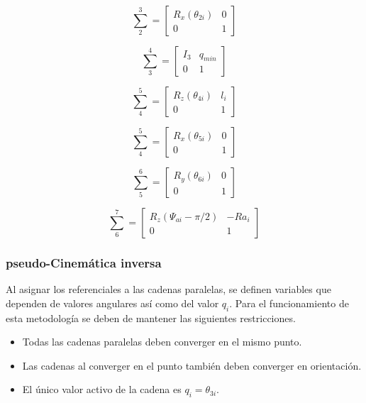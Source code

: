 \begin{equation}
\sum_2^3 = \begin{bmatrix}
R_x(\theta_{2i}) & 0\\
0 & 1
\end{bmatrix}
\end{equation}

\begin{equation}
\sum_3^4 = \begin{bmatrix}
I_3 & q_{min}\\
0 & 1
\end{bmatrix}
\end{equation}

\begin{equation}
\sum_4^5 = \begin{bmatrix}
R_z(\theta_{4i}) & l_i\\
0 & 1
\end{bmatrix}
\end{equation}

\begin{equation}
\sum_4^5 = \begin{bmatrix}
R_x(\theta_{5i}) & 0\\
0 & 1
\end{bmatrix}
\end{equation}

\begin{equation}
\sum_5^6 = \begin{bmatrix}
R_y(\theta_{6i}) & 0\\
0 & 1
\end{bmatrix}
\end{equation}

\begin{equation}
\sum_6^7 = \begin{bmatrix}
R_z(\Psi_{ai} - \pi/2) & -Ra_i\\
0 & 1
\end{bmatrix}
\end{equation}

\subsubsection{pseudo-Cinemática inversa}
Al asignar los referenciales a las cadenas paralelas, se definen variables que dependen de 
valores angulares así como del valor $q_i$. Para el funcionamiento de esta metodología se 
deben de mantener las siguientes restricciones.

\begin{itemize}
  \item Todas las cadenas paralelas deben converger en el mismo punto.
  \item Las cadenas al converger en el punto también deben converger en orientación.
  \item El único valor activo de la cadena es $q_i = \theta_{3i}$.
\end{itemize}

